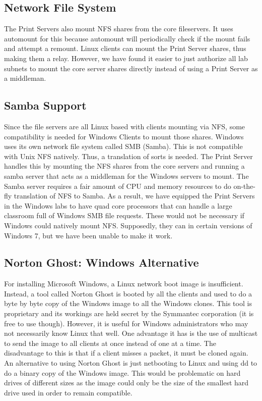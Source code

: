 \subsection{Network File System}
The Print Servers also mount NFS shares from the core fileservers.  It uses automount for this because automount will periodically check if the mount fails and attempt a remount.  Linux clients can mount the Print Server shares, thus making them a relay.  However, we have found it easier to just authorize all lab subnets to mount the core server shares directly instead of using a Print Server as a middleman.  

\subsection{Samba Support}
Since the file servers are all Linux based with clients mounting via NFS, some compatibility is needed for Windows Clients to mount those shares.  Windows uses its own network file system called SMB (Samba).  This is not compatible with Unix NFS natively.  Thus, a translation of sorts is needed.  The Print Server handles this by mounting the NFS shares from the core servers and running a samba server that acts as a middleman for the Windows servers to mount.  The Samba server requires a fair amount of CPU and memory resources to do on-the-fly translation of NFS to Samba. As a result, we have equipped the Print Servers in the Windows labs to have quad core processors that can handle a large classroom full of Windows SMB file requests. These would not be necessary if Windows could natively mount NFS. Supposedly, they can in certain versions of Windows 7, but we have been unable to make it work.

\subsection{Norton Ghost:  Windows Alternative}
For installing Microsoft Windows, a Linux network boot image is insufficient.  Instead, a tool called Norton Ghost is booted by all the clients and used to do a byte by byte copy of the Windows image to all the Windows clones.  This tool is proprietary and its workings are held secret by the Symmantec corporation (it is free to use though).  However, it is useful for Windows administrators who may not necessarily know Linux that well.  One advantage it has is the use of multicast to send the image to all clients at once instead of one at a time.  The disadvantage to this is that if a client misses a packet, it must be cloned again.  An alternative to using Norton Ghost is just netbooting to Linux and using dd to do a binary copy of the Windows image.  This would be problematic on hard drives of different sizes as the image could only be the size of the smallest hard drive used in order to remain compatible.  

